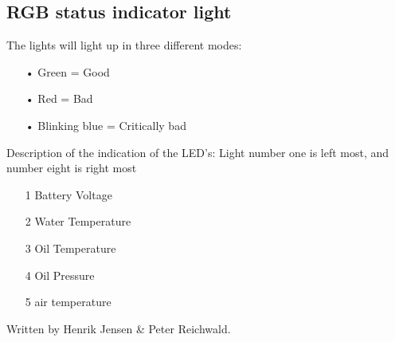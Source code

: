 \subsection*{RGB status indicator light}
The lights will light up in three different modes:
\begin{enumerate}
	\item[•]Green = Good
	\item[•]Red = Bad
	\item[•]Blinking blue = Critically bad
\end{enumerate}
Description of the indication of the LED's:
Light number one is left most, and number eight is right most
\begin{enumerate}
	\item[1] Battery Voltage
	\item[2] Water Temperature
	\item[3] Oil Temperature
	\item[4] Oil Pressure
	\item[5] air temperature
\end{enumerate}
Written by Henrik Jensen \& Peter Reichwald.
